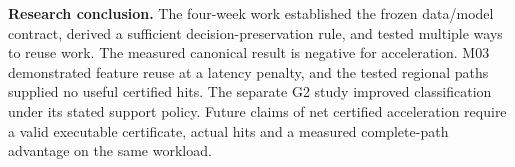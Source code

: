 \textbf{Research conclusion.} The four-week work established the frozen data/model contract, derived a sufficient decision-preservation rule, and tested multiple ways to reuse work. The measured canonical result is negative for acceleration. M03 demonstrated feature reuse at a latency penalty, and the tested regional paths supplied no useful certified hits. The separate G2 study improved classification under its stated support policy. Future claims of net certified acceleration require a valid executable certificate, actual hits and a measured complete-path advantage on the same workload.
